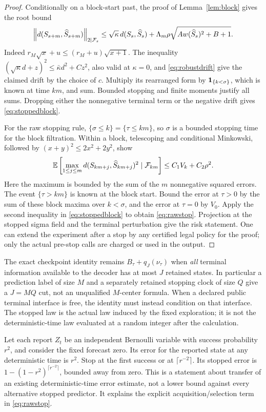 \begin{proof}
Conditionally on a block-start past, the proof of Lemma~\ref{lem:block} gives the root bound
\[
 \left\lVert d(S_{s+m},\widehat S_{s+m})\right\rVert_{2\mid\mathcal F_s}
 \le\sqrt\kappa\,d(S_s,\widehat S_s)
     +\Lambda_m\rho\sqrt{Aw(\widehat S_s)^2+B+1}.
\]
Indeed $r_M\sqrt{x}+u\le(r_M+u)\sqrt{x+1}$. The inequality
$(\sqrt\kappa d+z)^2\le\bar\kappa d^2+Cz^2$, also valid at $\kappa=0$, and \eqref{eq:robustdrift} give the claimed drift by the choice of $c$. Multiply its rearranged form by $\mathbf 1_{\{k<\sigma\}}$, which is known at time $km$, and sum. Bounded stopping and finite moments justify all sums. Dropping either the nonnegative terminal term or the negative drift gives \eqref{eq:stoppedblock}.

For the raw stopping rule, $\{\sigma\le k\}=\{\tau\le km\}$, so $\sigma$ is a bounded stopping time for the block filtration. Within a block, telescoping and conditional Minkowski, followed by $(x+y)^2\le2x^2+2y^2$, show
\[
 \mathbb E\left[\max_{1\le j\le m}d(S_{km+j},\widehat S_{km+j})^2\mid\mathcal F_{km}\right]
 \le C_1 V_k+C_2\rho^2.
\]
Here the maximum is bounded by the sum of the $m$ nonnegative squared errors. The event $\{\tau>km\}$ is known at the block start. Bound the error at $\tau>0$ by the sum of these block maxima over $k<\sigma$, and the error at $\tau=0$ by $V_0$. Apply the second inequality in \eqref{eq:stoppedblock} to obtain \eqref{eq:rawstop}. Projection at the stopped sigma field and the terminal perturbation give the risk statement. One can extend the experiment after a stop by any certified legal policy for the proof; only the actual pre-stop calls are charged or used in the output.
\end{proof}

The exact checkpoint identity remains $B_\tau+q_J(\nu_\tau)$ when \emph{all} terminal information available to the decoder has at most $J$ retained states. In particular a prediction label of size $M$ and a separately retained stopping clock of size $Q$ give a $J=MQ$ cut, not an unqualified $M$-center formula. When a declared public terminal interface is free, the identity must instead condition on that interface. The stopped law is the actual law induced by the fixed exploration; it is not the deterministic-time law evaluated at a random integer after the calculation.

\begin{example}\label{ex:stop}
Let each report $Z_t$ be an independent Bernoulli variable with success probability $r^2$, and consider the fixed forecast zero. Its error for the reported state at any deterministic time is $r^2$. Stop at the first success or at $\lceil r^{-2}\rceil$. Its stopped error is $1-(1-r^2)^{\lceil r^{-2}\rceil}$, bounded away from zero. This is a statement about transfer of an existing deterministic-time error estimate, not a lower bound against every alternative stopped predictor. It explains the explicit acquisition/selection term in \eqref{eq:rawstop}.
\end{example}
